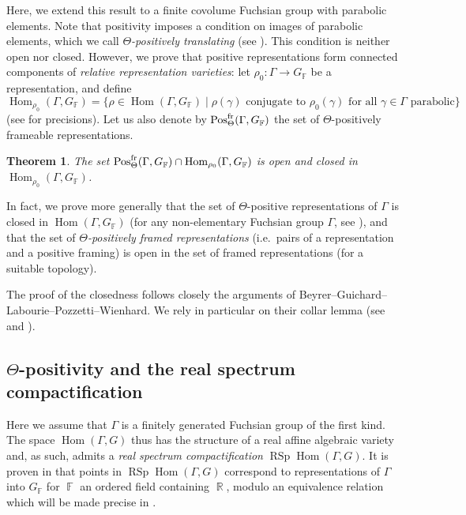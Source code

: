 \documentclass{amsart}
\theoremstyle{plain}
\newtheorem{ThmIntro}{Theorem}
\theoremstyle{definition}
\DeclareMathOperator{\Hom}{Hom}
\DeclareMathOperator{\RSp}{RSp}
\DeclareMathOperator{\Pos}{Pos}
\DeclareMathOperator{\R}{\mathbb{R}}
\DeclareMathOperator{\Fb}{{\mathbb{F}}}
\newcommand{\fr}{\textnormal{fr}}
\newcommand{\1}{\mathbf{1}}
\begin{document}
Here, we extend this result to a finite covolume Fuchsian group with parabolic elements. Note that positivity imposes a condition on images of parabolic elements, which we call \emph{$\Theta$-positively translating} (see ). This condition is neither open nor closed. However, we prove that positive representations form connected components of \emph{relative representation varieties}: let $\rho_0 \colon \Gamma \to G_{\Fb}$ be a representation, and define
\[\Hom_{\rho_0}(\Gamma, G_{\Fb}) = \{\rho \in \Hom(\Gamma, G_{\Fb})\mid \rho(\gamma) \textrm{ conjugate to $\rho_0(\gamma)$ for all $\gamma \in \Gamma$ parabolic}\}\]
(see  for precisions). Let us also denote by $\Pos_\Theta^{\fr}(\Gamma, G_{\Fb})$ the set of $\Theta$-positively frameable representations.

\begin{ThmIntro} \label{thm-intro: Positivity closed}
    The set $\Pos_\Theta^{\fr}(\Gamma,G_{\Fb})\cap \Hom_{\rho_0}(\Gamma, G_{\Fb})$ is open and closed in\break $\Hom_{\rho_0}(\Gamma,G_{\Fb})$.
\end{ThmIntro}

In fact, we prove more generally that the set of $\Theta$-positive representations of $\Gamma$ is closed in $\Hom(\Gamma, G_{\Fb})$ (for any non-elementary Fuchsian group $\Gamma$, see ), and that the set of \emph{$\Theta$-positively framed representations} (i.e.\ pairs of a representation and a positive framing) is open in the set of framed representations (for a suitable topology).

The proof of the closedness follows closely the arguments of Beyrer--Guichard--Labourie--Pozzetti--Wienhard. We rely in particular on their collar lemma (see  and \cite[Theorem C, Corollary D]{BeyrerGuichardLabouriePozzettiWienhard_PositivityCrossRatiosCollarLemma}).

\subsection{%
\texorpdfstring{%
$\Theta$-positivity and the real spectrum compactification}%
{Theta-positivity and the real spectrum compactification}}
Here we assume that $\Gamma$ is a finitely generated Fuchsian group of the first kind. The space $\Hom(\Gamma,G)$ thus has the structure of a real affine algebraic variety and, as such, admits a \emph{real spectrum compactification} $\RSp \Hom(\Gamma,G)$. It is proven in \cite{BurgerIozziParreauPozzetti_RSCCharacterVarieties2} that points in $\RSp \Hom(\Gamma,G)$ correspond to representations of $\Gamma$ into $G_{\Fb}$ for $\Fb$ an ordered field containing $\R$, modulo an equivalence relation which will be made precise in .
\end{document}
